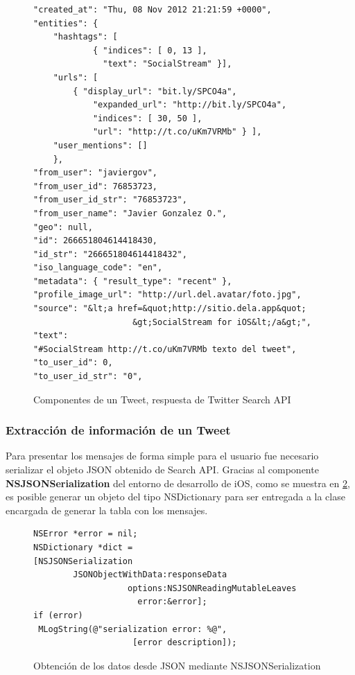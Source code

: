 \begin{figure}[H]
	\centering
	\begin{lstlisting}
"created_at": "Thu, 08 Nov 2012 21:21:59 +0000",
"entities": {
    "hashtags": [
    		{ "indices": [ 0, 13 ], 
    		  "text": "SocialStream" }],
    "urls": [
        { "display_url": "bit.ly/SPCO4a",
            "expanded_url": "http://bit.ly/SPCO4a",
            "indices": [ 30, 50 ],
            "url": "http://t.co/uKm7VRMb" } ],
    "user_mentions": [] 
    },
"from_user": "javiergov",
"from_user_id": 76853723,
"from_user_id_str": "76853723",
"from_user_name": "Javier Gonzalez O.",
"geo": null,
"id": 266651804614418430,
"id_str": "266651804614418432",
"iso_language_code": "en",
"metadata": { "result_type": "recent" },
"profile_image_url": "http://url.del.avatar/foto.jpg",
"source": "&lt;a href=&quot;http://sitio.dela.app&quot;
					&gt;SocialStream for iOS&lt;/a&gt;",
"text": 
"#SocialStream http://t.co/uKm7VRMb texto del tweet",
"to_user_id": 0,
"to_user_id_str": "0",
        	\end{lstlisting}
	\caption{Componentes de un Tweet, respuesta de Twitter Search API}
	\label{tweet-json}	
\end{figure}			

		
		\subsubsection{Extracción de información de un Tweet}
Para presentar los mensajes de forma simple para el usuario fue necesario serializar el objeto JSON obtenido de Search API. Gracias al componente \textbf{NSJSONSerialization} del entorno de desarrollo de iOS, como se muestra en \ref{json-serialization}, es posible generar un objeto del tipo NSDictionary para ser entregada a la clase encargada de generar la tabla con los mensajes.

\begin{figure}[H]
	\centering
\begin{lstlisting}
NSError *error = nil;
NSDictionary *dict =
[NSJSONSerialization 
		JSONObjectWithData:responseData 
				   options:NSJSONReadingMutableLeaves
                   	 error:&error];
if (error) 
 MLogString(@"serialization error: %@",
 					[error description]);
\end{lstlisting}
	\caption{Obtención de los datos desde JSON mediante NSJSONSerialization}
	\label{json-serialization}
\end{figure}	

